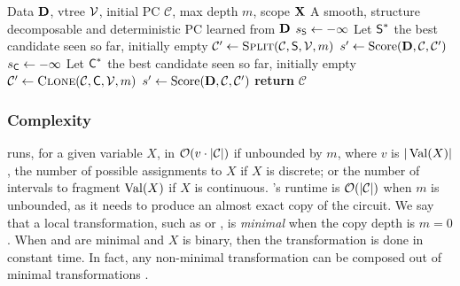 \begin{algorithm}[t]
  \caption{}\label{alg:learnpsdd}
  \begin{algorithmic}[1]
    \Require Data $\mathbf{D}$, vtree $\operatorname{\mathcal{V}}$, initial PC $\mathcal{C}$, max depth $m$, scope $\mathbf{X}$
    \Ensure A smooth, structure decomposable and deterministic PC learned from $\mathbf{D}$
      \State $s_{\operatorname{\textsf{S}}}\gets -\infty$
      \State Let $\operatorname{\textsf{S}}^\ast$ the best  candidate seen so far, initially empty
        \State $\mathcal{C}'\gets\textproc{Split}(\mathcal{C},\Sum,\vtree,m)$
        \State $s'\gets\operatorname{\normalfont{Score}}(\mathbf{D},\mathcal{C},\mathcal{C}')$
      \EndFor
      \State $s_{\operatorname{\textsf{C}}}\gets -\infty$
      \State Let $\operatorname{\textsf{C}}^\ast$ the best  candidate seen so far, initially empty
        \State $\mathcal{C}'\gets\textproc{Clone}(\mathcal{C},\Child,\vtree,m)$
        \State $s'\gets\operatorname{\normalfont{Score}}(\mathbf{D},\mathcal{C},\mathcal{C}')$
      \EndFor
    \EndWhile
    \State \textbf{return} $\mathcal{C}$
  \end{algorithmic}
\end{algorithm}

\subsubsection{Complexity}

 runs, for a given variable $X$, in $\mathcal{O}(v\cdot|\mathcal{C}|)$ if unbounded
by $m$, where $v$ is $|\operatorname*{\normalfont{Val}}(X)|$, the number of possible assignments to $X$ if $X$ is discrete; or
the number of intervals to fragment $\operatorname*{\normalfont{Val}}(X)$ if $X$ is continuous. 's runtime is
$\mathcal{O}(|\mathcal{C}|)$ when $m$ is unbounded, as it needs to produce an almost exact copy of
the circuit. We say that a local transformation, such as  or , is
\emph{minimal} when the copy depth is $m=0$. When  and  are minimal
and $X$ is binary, then the transformation is done in constant time. In fact, any non-minimal
transformation can be composed out of minimal transformations \citep{liang17}.

